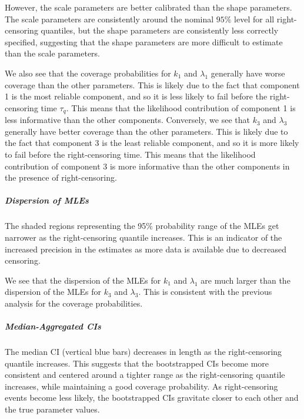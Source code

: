 \documentclass[
]{article}
\theoremstyle{definition}
\theoremstyle{plain}
\theoremstyle{definition}
\theoremstyle{definition}
\theoremstyle{definition}
\theoremstyle{definition}
\theoremstyle{remark}
\begin{document}
However, the scale parameters are better calibrated than the shape parameters.
The scale parameters are consistently around the nominal \(95\%\) level for all
right-censoring quantiles, but the shape parameters are consistently less
correctly specified, suggesting that the shape parameters are more difficult to
estimate than the scale parameters.

We also see that the coverage probabilities for \(k_1\) and \(\lambda_1\) generally
have worse coverage than the other parameters. This is likely due to the fact
that component 1 is the most reliable component, and so it is less likely to
fail before the right-censoring time \(\tau_q\). This means that the likelihood
contribution of component 1 is less informative than the other components.
Conversely, we see that \(k_3\) and \(\lambda_3\) generally have better coverage
than the other parameters. This is likely due to the fact that component 3 is
the least reliable component, and so it is more likely to fail before the
right-censoring time. This means that the likelihood contribution of component
3 is more informative than the other components in the presence of
right-censoring.

\hypertarget{dispersion-of-mles}{%
\subparagraph*{Dispersion of MLEs}\label{dispersion-of-mles}}

The shaded regions representing the 95\% probability range of the MLEs get
narrower as the right-censoring quantile increases. This is an indicator of the
increased precision in the estimates as more data is available due to decreased
censoring.

We see that the dispersion of the MLEs for \(k_1\) and \(\lambda_1\) are much
larger than the dispersion of the MLEs for \(k_3\) and \(\lambda_3\). This is
consistent with the previous analysis for the coverage probabilities.

\hypertarget{median-aggregated-cis}{%
\subparagraph*{Median-Aggregated CIs}\label{median-aggregated-cis}}

The median CI (vertical blue bars) decreases in length as the right-censoring
quantile increases. This suggests that the bootstrapped CIs become more
consistent and centered around a tighter range as the right-censoring quantile
increases, while maintaining a good coverage probability. As right-censoring
events become less likely, the bootstrapped CIs gravitate closer to each other
and the true parameter values.
\end{document}
